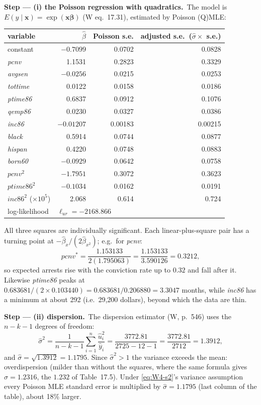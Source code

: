 \documentclass[11pt,a4paper]{article}
\numberwithin{equation}{questao}   %
\newcommand{\passo}[2]{\par\smallskip\noindent\textbf{Step --- #1.}~#2}
\begin{document}
\begin{sol}
\passo{(i) the Poisson regression with quadratics}{The model is
$E(y\mid\mathbf x)=\exp(\mathbf x\boldsymbol\beta)$ (W eq.~17.31), estimated by Poisson (Q)MLE:
\begin{center}\small\begin{tabular}{lrrr}\toprule
variable & $\hat\beta$ & Poisson s.e. & adjusted s.e.\ ($\hat\sigma\times$ s.e.)\\\midrule
constant & $-0.7099$ & 0.0702 & 0.0828\\
\textit{pcnv} & 1.1531 & 0.2823 & 0.3329\\
\textit{avgsen} & $-0.0256$ & 0.0215 & 0.0253\\
\textit{tottime} & 0.0122 & 0.0158 & 0.0186\\
\textit{ptime86} & 0.6837 & 0.0912 & 0.1076\\
\textit{qemp86} & 0.0230 & 0.0327 & 0.0386\\
\textit{inc86} & $-0.01207$ & 0.00183 & 0.00215\\
\textit{black} & 0.5914 & 0.0744 & 0.0877\\
\textit{hispan} & 0.4220 & 0.0748 & 0.0883\\
\textit{born60} & $-0.0929$ & 0.0642 & 0.0758\\
$\textit{pcnv}^2$ & $-1.7951$ & 0.3072 & 0.3623\\
$\textit{ptime86}^2$ & $-0.1034$ & 0.0162 & 0.0191\\
$\textit{inc86}^2$ ($\times10^{5}$) & 2.068 & 0.614 & 0.724\\\midrule
log-likelihood & \multicolumn{3}{l}{$\ell_{ur}=-2168.866$}\\\bottomrule\end{tabular}\end{center}
All three squares are individually significant. Each linear-plus-square pair has a turning
point at $-\hat\beta_x/(2\hat\beta_{x^2})$; e.g.\ for \textit{pcnv}:
\begin{equation}\label{eq:W4-tp}
\textit{pcnv}^*=\frac{1.153133}{2(1.795063)}=\frac{1.153133}{3.590126}=0.3212,
\end{equation}
so expected arrests rise with the conviction rate up to $0.32$ and fall after it. Likewise
\textit{ptime86} peaks at $0.683681/(2\times0.103440)=0.683681/0.206880=3.3047$ months, while
\textit{inc86} has a minimum at about 292 (i.e.\ 29{,}200 dollars), beyond which the data are thin.}

\passo{(ii) dispersion}{The dispersion estimator (W, p.~546) uses the $n-k-1$ degrees of freedom:
\begin{equation}\label{eq:W4-s2}
\hat\sigma^2=\frac{1}{n-k-1}\sum_{i=1}^n\frac{\hat u_i^2}{\hat y_i}=\frac{3772.81}{2725-12-1}=\frac{3772.81}{2712}=1.3912,
\end{equation}
and $\hat\sigma=\sqrt{1.3912}=1.1795$. Since $\hat\sigma^2>1$ the variance exceeds the mean:
overdispersion (milder than without the squares, where the same formula gives $\hat\sigma=1.2316$,
the $1.232$ of Table~17.5). Under \eqref{eq:W4-s2}'s variance assumption every Poisson MLE standard
error is multiplied by $\hat\sigma=1.1795$ (last column of the table), about 18\% larger.}


\end{sol}
\end{document}
